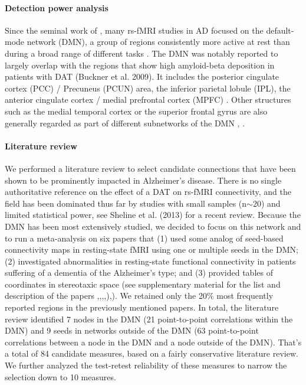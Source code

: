 \documentclass[authoryear]{elsarticle}
\begin{document}
\paragraph{Detection power analysis} 
Since the seminal work of \cite{Greicius2004}, many rs-fMRI studies in AD focused on the default-mode network (DMN), a group of regions consistently more active at rest than during a broad range of different tasks \cite{Gusnard2001}. The DMN was notably reported to largely overlap with the regions that show high amyloid-beta deposition in patients with DAT (Buckner et al. 2009). It includes the posterior cingulate cortex (PCC) / Precuneus (PCUN) area, the inferior parietal lobule (IPL), the anterior cingulate cortex / medial prefrontal cortex (MPFC) \citep{Greicius2003}. Other structures such as the medial temporal cortex or the superior frontal gyrus are also generally regarded as part of different subnetworks of the DMN \citep{Margulies2009}, \citep{Andrews-Hanna2010}.

\paragraph{Literature review}
We performed a literature review to select candidate connections that have been shown to be prominently impacted in Alzheimer’s disease. There is no single authoritative reference on the effect of a DAT on rs-fMRI connectivity, and the field has been dominated thus far by studies with small samples (n$\sim$20) and limited statistical power, see Sheline et al. (2013) for a recent review. Because the DMN has been most extensively studied, we decided to focus on this network and to run a meta-analysis on six papers that (1) used some analog of seed-based connectivity maps in resting-state fMRI using one or multiple seeds in the DMN; (2) investigated abnormalities in resting-state functional connectivity in patients suffering of a dementia of the Alzheimer’s type; and (3) provided tables of coordinates in stereotaxic space (see supplementary material for the list and description of the papers \cite{Zhang2009a},\cite{Zhang2010},\cite{Wang2006a},\cite{Wang2007a},\cite{Goveas2011}),\cite{Damoiseaux2012}). We 
retained only the 20\% most frequently reported regions in the previously mentioned papers. In total, the literature review identified 7 nodes in the DMN (21 point-to-point correlations within the DMN) and 9 seeds in networks outside of the DMN (63 point-to-point correlations between a node in the DMN and a node outside of the DMN). That’s a total of 84 candidate measures, based on a fairly conservative literature review. We further analyzed the test-retest reliability of these measures to narrow the selection down to 10 measures.
\end{document}
